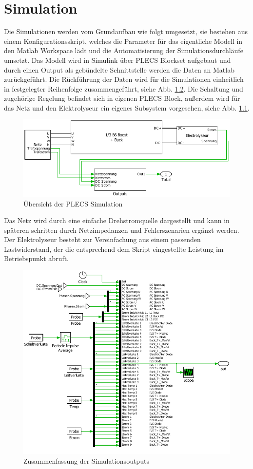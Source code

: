 \chapter{Simulation}
Die Simulationen werden vom Grundaufbau wie folgt umgesetzt, sie bestehen aus einem Konfigurationsskript, welches die Parameter für das eigentliche Modell in den Matlab Workspace lädt und die Automatisierung der Simulationsdurchläufe umsetzt. Das Modell wird in Simulink über PLECS Blockset aufgebaut und durch einen Output als gebündelte Schnittstelle werden die Daten an Matlab zurückgeführt. Die Rückführung der Daten wird für die Simulationen einheitlich in festgelegter Reihenfolge zusammengeführt, siehe Abb. \ref{fig:plecsout}. Die Schaltung und zugehörige Regelung befindet sich in eigenen PLECS Block, außerdem wird für das Netz und den Elektrolyseur ein eigenes Subsystem vorgesehen, siehe Abb. \ref{fig:plecssimulationsaufbau}.  
\begin{figure}
\centering
\includegraphics[width=0.9\linewidth]{content/Grafiken/PLECS_Simulationsaufbau}
\caption[Übersicht der PLECS Simulation]{Übersicht der PLECS Simulation}
\label{fig:plecssimulationsaufbau}
\end{figure}
Das Netz wird durch eine einfache Drehstromquelle dargestellt und kann in späteren schritten durch Netzimpedanzen und Fehlerszenarien ergänzt werden. Der Elektrolyseur besteht zur Vereinfachung aus einem passenden Lastwiderstand, der die entsprechend dem Skript eingestellte Leistung im Betriebspunkt abruft. 
\begin{figure}
\centering
\includegraphics[width=0.9\linewidth]{content/Grafiken/Plecs_Out}
\caption[Zusammenfassung der Simulationsoutputs]{Zusammenfassung der Simulationsoutputs}
\label{fig:plecsout}
\end{figure}


